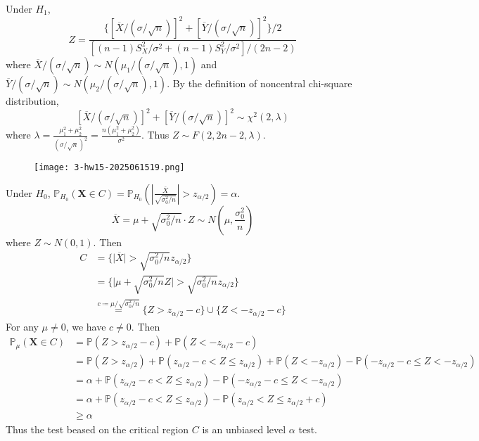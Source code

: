 Under $H_1$,
\[
Z=\frac{\{ [ \overline{X}/(\sigma/\sqrt{ n })]^{2}+[\overline{Y}/(\sigma/\sqrt{ n })]^{2} \}/2}{[(n-1)S_{X}^{2}/\sigma^{2}+(n-1)S_{Y}^{2}/\sigma^{2}]/(2n-2)}
\]
where $\overline{X}/(\sigma/\sqrt{ n })\sim N(\mu_1/(\sigma/\sqrt{ n }),1)$ and $\overline{Y}/(\sigma/\sqrt{ n })\sim N(\mu_2/(\sigma/\sqrt{ n }),1)$. By the definition of noncentral chi-square distribution,
\[
\left[ \overline{X}/(\sigma/\sqrt{ n }) \right]^{2}+[\overline{Y}/(\sigma/\sqrt{ n })]^{2}\sim \chi^{2}(2,\lambda)
\]
where $\lambda=\frac{\mu_1^{2}+\mu_2^{2}}{(\sigma/\sqrt{ n })^{2}}=\frac{n(\mu_1^{2}+\mu_2^{2})}{\sigma^{2}}$. Thus $Z\sim F(2,2n-2,\lambda)$.

\begin{exercise}
\begin{figure}[H]
\centering
\texttt{[image: 3-hw15-2025061519.png]}
\label{}
\end{figure}
\end{exercise}
Under $H_0$, $\mathbb{P}_{H_0}(\mathbf{X}\in C)=\mathbb{P}_{H_0}\left( \left\lvert  \frac{\overline{X}}{\sqrt{ \sigma_0^{2}/n }}  \right\rvert>z_{\alpha/2 } \right)=\alpha$.
\[
\overline{X}=\mu+\sqrt{ \sigma_0^{2}/n }\cdot Z\sim N\left( \mu,\frac{\sigma_0^{2}}{n} \right)
\]
where $Z\sim N(0,1)$. Then
\[
\begin{aligned}
C & =\{ \lvert \overline{X} \rvert >\sqrt{ \sigma_0^{2}/n }z_{\alpha/2 } \} \\
 & =\{ \lvert \mu+\sqrt{ \sigma_0^{2}/n }Z \rvert >\sqrt{ \sigma_0^{2}/n }z_{\alpha/2 } \} \\
 & \overset{ c\coloneqq \mu/\sqrt{ \sigma_0^{2}/n } }{ = }\{ Z>z_{\alpha/2 }-c \}\cup \{ Z<-z_{\alpha/2 }-c \} 
\end{aligned}
\]
For any $\mu\neq0$, we have $c\neq0$. Then
\[
\begin{aligned}
\mathbb{P}_{\mu}(\mathbf{X}\in C) & =\mathbb{P}(Z>z_{\alpha/2 }-c)+\mathbb{P}(Z<-z_{\alpha/2 }-c) \\
 & =\mathbb{P}(Z>z_{\alpha/2 })+\mathbb{P}(z_{\alpha/2 }-c<Z\leq z_{\alpha/2  })+\mathbb{P}(Z<-z_{\alpha/2 })-\mathbb{P}(-z_{\alpha/2 }-c\leq Z<-z_{\alpha/2 }) \\
 & =\alpha+\mathbb{P}(z_{\alpha/2 }-c<Z\leq z_{\alpha/2  })-\mathbb{P}(-z_{\alpha/2 }-c\leq Z<-z_{\alpha/2 }) \\
 & =\alpha+\mathbb{P}(z_{\alpha/2 }-c<Z\leq z_{\alpha/2  })-\mathbb{P}(z_{\alpha/ 2 }<Z\leq z_{\alpha/2  }+c) \\
 & \geq \alpha
\end{aligned}
\]
Thus the test beased on the critical region $C$ is an unbiased level $\alpha$ test.

